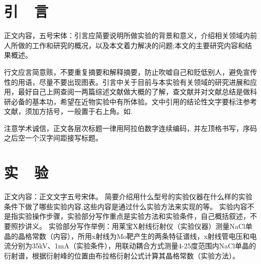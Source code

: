 \documentclass{iceli}
\begin{document}

\wuhao 
\section{引~~言}
正文内容，五号宋体：引言应简要说明所做实验的背景和意义，介绍相关领域内前人所做的工作和研究的概况，以及本文着力解决的问题;本文的主要研究内容和结果概述。

行文应言简意赅，不要重复摘要和解释摘要，防止吹嘘自己和贬低别人，避免宣传性的用语，尽量不要出现图表。引言中关于目前与本实验有关领域的研究进展和应用，最好自己上网查阅一两篇综述文献做大概的了解，查文献并对文献总结是做科研必备的基本功，希望在近物实验中有所体验。文中引用的结论性文字要标注参考文献，须加方括号，一般置于右上角。如\cite{ceshi}.

注意学术诚信，正文各层次标题一律用阿拉伯数字连续编码，并左顶格书写，序码之后空一个汉字间距接写标题。

\section{实~~验}
正文内容：正文文字五号宋体。
\enlargethispage{-1.5cm}
简要介绍用什么型号的实验仪器在什么样的实验条件下做了哪些实验内容,这些内容是通过什么实验方法来实现的等。
实验内容不是指实验操作步骤，实验部分写作重点是实验方法和实验条件，自己概括叙述，不要照抄讲义。
实验部分写作举例：用莱宝X射线衍射仪（实验仪器）测量NaCl单晶的晶格常数（内容），所用x射线为Mo靶产生的两条特征谱线，x射线管电压和电流分别为35kV、1mA（实验条件），用联动耦合方式测量4-25度范围内NaCl单晶的衍射谱，根据衍射峰的位置由布拉格衍射公式计算其晶格常数（实验方法）。
\end{document}

